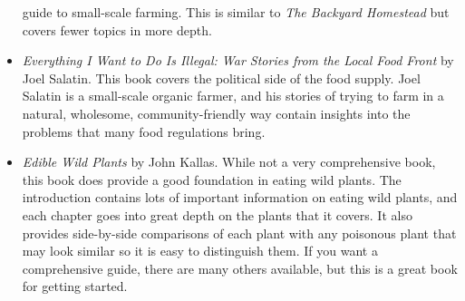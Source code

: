 \begin{itemize}
guide to small-scale farming.  This is similar to \textit{The Backyard Homestead} but covers fewer
topics in more depth. 
\item 
\textit{Everything I Want to Do Is Illegal: War Stories from the Local Food Front} by Joel Salatin.
This book covers the political side of the food supply.  Joel Salatin is a small-scale organic farmer,
and his stories of trying to farm in a natural, wholesome, community-friendly way contain insights
into the problems that many food regulations bring.
\item
\textit{Edible Wild Plants} by John Kallas.  While not a very comprehensive book, this book does provide a 
good foundation in eating wild plants.  The introduction contains lots of important information on 
eating wild plants, and each chapter goes into great depth on the plants that it covers.  It also provides
side-by-side comparisons of each plant with any poisonous plant that may look similar so it is easy
to distinguish them.  If you want a comprehensive guide, there are many others available, but this is
a great book for getting started.
\end{itemize}
